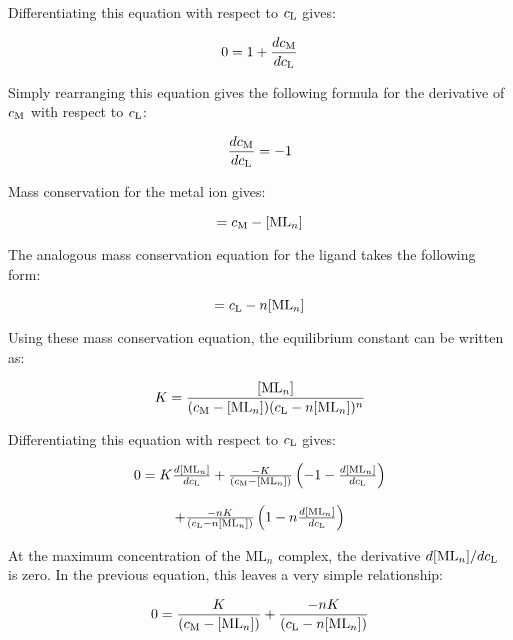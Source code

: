 Differentiating this equation with respect to $c_{\text L}$ gives:

\begin{equation}
0 = 1 + \frac{dc_{\text M}}{dc_{\text L}}
\end{equation}

Simply rearranging this equation gives the following formula for the derivative of  $c_{\text M}$ with respect to  $c_{\text L}$:

\begin{equation}
\frac{dc_{\text M}}{dc_{\text L}} = -1 
\end{equation}

Mass conservation for the metal ion gives:

\begin{equation}
[\text M] = c_{\text M} - [\text {ML}_n] 
\end{equation}

The analogous mass conservation equation for the ligand takes the following form:

\begin{equation}
[\text L] = c_{\text L} - n[\text {ML}_n] 
\end{equation}

Using these mass conservation equation, the equilibrium constant can be written as:

\begin{equation}
K = \frac{[ \text{ML}_n ]}{(c_{\text M} - [\text {ML}_n] )(c_{\text L} - n[\text {ML}_n])^n }
\end{equation}


Differentiating this equation with respect to $c_{\text L}$ gives:

\begin{equation}
\begin{array}{cccc}
0 = K \frac{d[ \text{ML}_n ]}{dc_{\text L}} + \frac{-K}{(c_{\text M} - [\text {ML}_n] )} \left ( -1 - \frac{d[ \text{ML}_n ]}{dc_{\text L}} \right )
\\{}\\
 + \frac{-nK}{(c_{\text L} - n[\text {ML}_n])} \left ( 1 - n \frac{d[ \text{ML}_n ]}{dc_{\text L}} \right )
\end{array}
\end{equation}

At the maximum concentration of the ML$_n$ complex, the derivative $d[ \text{ML}_n ] / dc_{\text L}$ is zero. In the previous equation, this leaves a very simple relationship:

\begin{equation}
0 = \frac{K}{(c_{\text M} - [\text {ML}_n] )}  + \frac{-nK}{(c_{\text L} - n[\text {ML}_n])} 
\end{equation}

